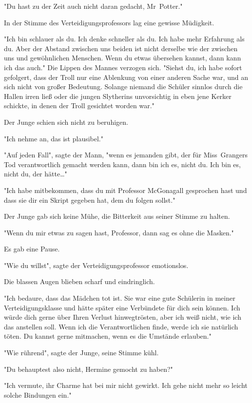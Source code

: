 {"Du hast zu der Zeit auch nicht daran gedacht, Mr~Potter."

In der Stimme des Verteidigungsprofessors lag eine gewisse Müdigkeit.

"Ich bin schlauer als du. Ich denke schneller als du. Ich habe mehr Erfahrung als du. Aber der Abstand zwischen uns beiden ist nicht derselbe wie der zwischen uns und gewöhnlichen Menschen. Wenn du etwas übersehen kannst, dann kann ich das auch." Die Lippen des Mannes verzogen sich. "Siehst du, ich habe sofort gefolgert, dass der Troll nur eine Ablenkung von einer anderen Sache war, und an sich nicht von großer Bedeutung. Solange niemand die Schüler sinnlos durch die Hallen irren ließ oder die jungen Slytherins unvorsichtig in eben jene Kerker schickte, in denen der Troll gesichtet worden war."

Der Junge schien sich nicht zu beruhigen.

"Ich nehme an, das ist plausibel."

"Auf jeden Fall", sagte der Mann, "wenn es jemanden gibt, der für Miss~Grangers Tod verantwortlich gemacht werden kann, dann bin ich es, nicht du. Ich bin es, nicht du, der hätte…"

"Ich habe mitbekommen, dass du mit Professor McGonagall gesprochen hast und dass sie dir ein Skript gegeben hat, dem du folgen sollst."

Der Junge gab sich keine Mühe, die Bitterkeit aus seiner Stimme zu halten.

"Wenn du mir etwas zu sagen hast, Professor, dann sag es ohne die Masken."

Es gab eine Pause.

"Wie du willst", sagte der Verteidigungsprofessor emotionslos.

Die blassen Augen blieben scharf und eindringlich.

"Ich bedaure, dass das Mädchen tot ist. Sie war eine gute Schülerin in meiner Verteidigungsklasse und hätte später eine Verbündete für dich sein können. Ich würde dich gerne über Ihren Verlust hinwegtrösten, aber ich weiß nicht, wie ich das anstellen soll. Wenn ich die Verantwortlichen finde, werde ich sie natürlich töten. Du kannst gerne mitmachen, wenn es die Umstände erlauben."

"Wie rührend", sagte der Junge, seine Stimme kühl.

"Du behauptest also nicht, Hermine gemocht zu haben?"

"Ich vermute, ihr Charme hat bei mir nicht gewirkt. Ich gehe nicht mehr so leicht solche Bindungen ein."

}
